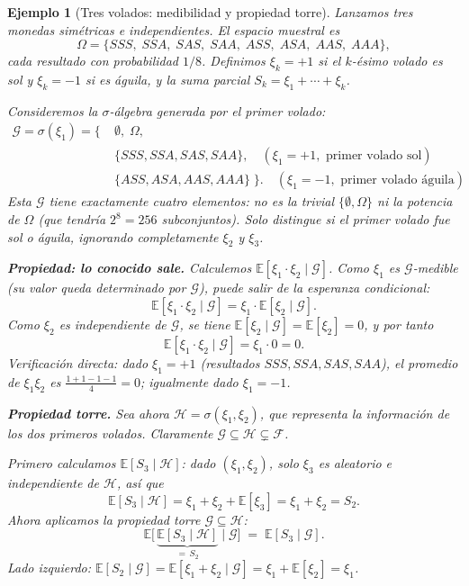 \documentclass[12pt]{book}
\newtheorem{example}{Ejemplo}[chapter]
\begin{document}
\begin{example}[Tres volados: medibilidad y propiedad torre]
    Lanzamos tres monedas simétricas e independientes. El espacio muestral es
    \[
        \Omega = \{SSS,\; SSA,\; SAS,\; SAA,\; ASS,\; ASA,\; AAS,\; AAA\},
    \]
    cada resultado con probabilidad $1/8$. Definimos $\xi_k = +1$ si el $k$-ésimo volado es sol y $\xi_k = -1$ si es águila, y la suma parcial $S_k = \xi_1 + \cdots + \xi_k$.

    \medskip
    Consideremos la $\sigma$-álgebra generada por el primer volado:
    \begin{align*}
        \mathcal{G} = \sigma(\xi_1) = \bigl\{\;&\emptyset,\;\Omega, \\
        &\{SSS, SSA, SAS, SAA\},\quad (\xi_1 = +1, \text{ primer volado sol})\\
        &\{ASS, ASA, AAS, AAA\}\;\bigr\}.\quad (\xi_1 = -1, \text{ primer volado águila})
    \end{align*}
    Esta $\mathcal{G}$ tiene exactamente cuatro elementos: no es la trivial $\{\emptyset,\Omega\}$ ni la potencia de $\Omega$ (que tendría $2^8 = 256$ subconjuntos). Solo distingue si el primer volado fue sol o águila, ignorando completamente $\xi_2$ y $\xi_3$.

    \medskip
    \textbf{Propiedad: lo conocido sale.} Calculemos $\mathbb{E}[\xi_1 \cdot \xi_2 \mid \mathcal{G}]$. Como $\xi_1$ es $\mathcal{G}$-medible (su valor queda determinado por $\mathcal{G}$), puede salir de la esperanza condicional:
    \[
        \mathbb{E}[\xi_1 \cdot \xi_2 \mid \mathcal{G}] = \xi_1 \cdot \mathbb{E}[\xi_2 \mid \mathcal{G}].
    \]
    Como $\xi_2$ es independiente de $\mathcal{G}$, se tiene $\mathbb{E}[\xi_2 \mid \mathcal{G}] = \mathbb{E}[\xi_2] = 0$, y por tanto
    \[
        \mathbb{E}[\xi_1 \cdot \xi_2 \mid \mathcal{G}] = \xi_1 \cdot 0 = 0.
    \]
    Verificación directa: dado $\xi_1 = +1$ (resultados $SSS, SSA, SAS, SAA$), el promedio de $\xi_1\xi_2$ es $\frac{1+1-1-1}{4} = 0$; igualmente dado $\xi_1=-1$. \checkmark

    \medskip
    \textbf{Propiedad torre.} Sea ahora $\mathcal{H} = \sigma(\xi_1, \xi_2)$, que representa la información de los dos primeros volados. Claramente $\mathcal{G} \subseteq \mathcal{H} \subsetneq \mathcal{F}$.

    Primero calculamos $\mathbb{E}[S_3 \mid \mathcal{H}]$: dado $(\xi_1, \xi_2)$, solo $\xi_3$ es aleatorio e independiente de $\mathcal{H}$, así que
    \[
        \mathbb{E}[S_3 \mid \mathcal{H}] = \xi_1 + \xi_2 + \mathbb{E}[\xi_3] = \xi_1 + \xi_2 = S_2.
    \]
    Ahora aplicamos la propiedad torre $\mathcal{G} \subseteq \mathcal{H}$:
    \[
        \mathbb{E}\bigl[\,\underbrace{\mathbb{E}[S_3 \mid \mathcal{H}]}_{=\,S_2} \;\Big|\; \mathcal{G}\bigr]
        \;=\; \mathbb{E}[S_3 \mid \mathcal{G}].
    \]
    Lado izquierdo: $\mathbb{E}[S_2 \mid \mathcal{G}] = \mathbb{E}[\xi_1 + \xi_2 \mid \mathcal{G}] = \xi_1 + \mathbb{E}[\xi_2] = \xi_1$.


\end{example}
\end{document}
